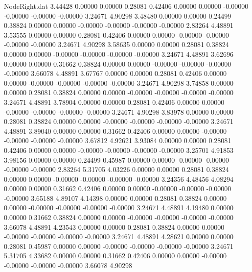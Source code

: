 \begin{filecontents}{NodeRight.dat}
   3.44428    0.00000    0.00000     0.28081    0.42406    0.00000    0.00000   -0.00000   -0.00000   -0.00000   -0.00000    3.24671    4.90298
   3.48480    0.00000    0.00000     0.24499    0.38824    0.00000    0.00000   -0.00000   -0.00000   -0.00000   -0.00000    2.83264    4.48891
   3.53555    0.00000    0.00000     0.28081    0.42406    0.00000    0.00000   -0.00000   -0.00000   -0.00000   -0.00000    3.24671    4.90298
   3.58635    0.00000    0.00000     0.28081    0.38824    0.00000    0.00000   -0.00000   -0.00000   -0.00000   -0.00000    3.24671    4.48891
   3.62696    0.00000    0.00000     0.31662    0.38824    0.00000    0.00000   -0.00000   -0.00000   -0.00000   -0.00000    3.66078    4.48891
   3.67767    0.00000    0.00000     0.28081    0.42406    0.00000    0.00000   -0.00000   -0.00000   -0.00000   -0.00000    3.24671    4.90298
   3.74858    0.00000    0.00000     0.28081    0.38824    0.00000    0.00000   -0.00000   -0.00000   -0.00000   -0.00000    3.24671    4.48891
   3.78904    0.00000    0.00000     0.28081    0.42406    0.00000    0.00000   -0.00000   -0.00000   -0.00000   -0.00000    3.24671    4.90298
   3.83978    0.00000    0.00000     0.28081    0.38824    0.00000    0.00000   -0.00000   -0.00000   -0.00000   -0.00000    3.24671    4.48891
   3.89040    0.00000    0.00000     0.31662    0.42406    0.00000    0.00000   -0.00000   -0.00000   -0.00000   -0.00000    3.67812    4.92621
   3.93084    0.00000    0.00000     0.28081    0.42406    0.00000    0.00000   -0.00000   -0.00000   -0.00000   -0.00000    3.25701    4.91853
   3.98156    0.00000    0.00000     0.24499    0.45987    0.00000    0.00000   -0.00000   -0.00000   -0.00000   -0.00000    2.83264    5.31705
   4.03226    0.00000    0.00000     0.28081    0.38824    0.00000    0.00000   -0.00000   -0.00000   -0.00000   -0.00000    3.24356    4.48456
   4.08294    0.00000    0.00000     0.31662    0.42406    0.00000    0.00000   -0.00000   -0.00000   -0.00000   -0.00000    3.65188    4.89107
   4.14398    0.00000    0.00000     0.28081    0.38824    0.00000    0.00000   -0.00000   -0.00000   -0.00000   -0.00000    3.24671    4.48891
   4.19480    0.00000    0.00000     0.31662    0.38824    0.00000    0.00000   -0.00000   -0.00000   -0.00000   -0.00000    3.66078    4.48891
   4.23543    0.00000    0.00000     0.28081    0.38824    0.00000    0.00000   -0.00000   -0.00000   -0.00000   -0.00000    3.24671    4.48891
   4.28621    0.00000    0.00000     0.28081    0.45987    0.00000    0.00000   -0.00000   -0.00000   -0.00000   -0.00000    3.24671    5.31705
   4.33682    0.00000    0.00000     0.31662    0.42406    0.00000    0.00000   -0.00000   -0.00000   -0.00000   -0.00000    3.66078    4.90298

\end{filecontents}

